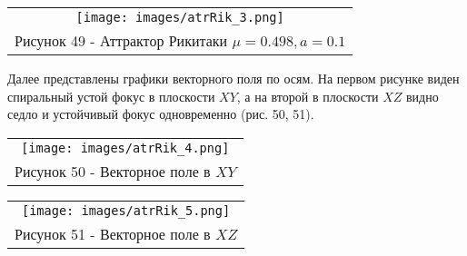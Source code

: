 \begin{center}
  \begin{tabular}{c}
  \texttt{[image: images/atrRik\_3.png]}\\
  Рисунок 49 - Аттрактор Рикитаки $\mu=0.498,a=0.1$
\end{tabular}
\end{center}

Далее представлены графики векторного поля по осям. На первом рисунке виден спиральный устой фокус в плоскости $XY$, а на второй в плоскости $XZ$ видно седло и устойчивый фокус одновременно (рис. 50, 51).

\begin{center}
  \begin{tabular}{c}
  \texttt{[image: images/atrRik\_4.png]}\\
  Рисунок 50 - Векторное поле в $XY$
  \end{tabular}
  \end{center}
  \begin{center}
    \begin{tabular}{c}
  \texttt{[image: images/atrRik\_5.png]}\\
  Рисунок 51 - Векторное поле в $XZ$
\end{tabular}
\end{center}

% 
